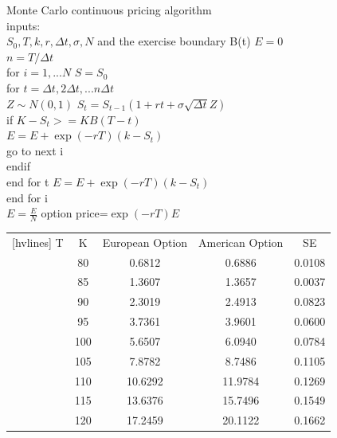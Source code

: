 \noindent Monte Carlo continuous pricing algorithm\\
inputs:  \\
$S_0,T,k, r,\Delta t, \sigma, N$ and the exercise boundary B(t) \newline
$E=0$\\
$n=T/\Delta t$\\
for $i=1,...N$  \newline
\indent $S=S_{0}$\\
\indent for $t=\Delta t,2\Delta t,...n\Delta t$\\
\indent $Z \sim N(0,1)$  \newline
\indent $S_{t}=S_{t-1}(1+rt+\sigma\sqrt{\Delta t}Z)$\\ %
\indent \indent if $K-S_{t}>=KB(T-t)$\\
\indent \indent \indent $E=E+\exp(-rT)(k-S_{t})$ \\ 
\indent \indent \indent go to next i\\
\indent\indent endif\\
\indent end for t
\indent $E=E+\exp(-rT)(k-S_{t})$ \\ 
end for i\\
$E=\frac{E}{N}$ \newline
option price=$\exp(-rT)E$  \newline


\begin{center}
	\begin{NiceTabular}{|c|c|c|c|c|}[hvlines]
		 T & K & European Option & American Option & SE \\ 
		& 80 &   0.6812 &   0.6886 &   0.0108 \\
		& 85 &   1.3607 &   1.3657 &   0.0037 \\ 
		& 90 &   2.3019 &   2.4913 &   0.0823 \\
		& 95 &   3.7361 &   3.9601 &   0.0600 \\
		& 100 &   5.6507 &   6.0940 &   0.0784 \\
		& 105 &   7.8782 &   8.7486 &   0.1105 \\
		& 110 &  10.6292 &  11.9784 &   0.1269 \\
		& 115 &  13.6376 &  15.7496 &   0.1549 \\
		& 120 &  17.2459 &  20.1122 &   0.1662 \\
	\end{NiceTabular}
\end{center}

